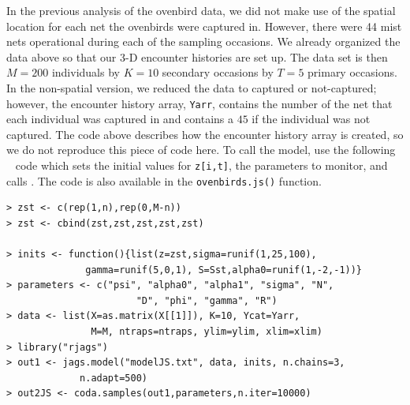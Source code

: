 In the previous analysis of the ovenbird data, we did not make use of
the spatial location for each net the ovenbirds were captured in.
However, there were 44 mist nets operational during each of the
sampling occasions.  We already organized the data above so that our
3-D encounter histories are set up.  The data set is then $M=200$
individuals by $K=10$ secondary occasions by $T=5$ primary occasions.
In the non-spatial version, we reduced the data to captured or
not-captured; however, the encounter history array, \mbox{\tt Yarr},
contains the number of the net that each individual was captured in
and contains a $45$ if the individual was not captured. The code above describes how the encounter
history array is created, so we
do not reproduce this piece of code here. To call the model, use the following
\R~ code which sets the initial values for \mbox{\tt z[i,t]}, the parameters to
monitor, and calls \jags.  The code is also available in the \verb+ovenbirds.js()+ function.

{\small 
\begin{verbatim}
> zst <- c(rep(1,n),rep(0,M-n))
> zst <- cbind(zst,zst,zst,zst,zst)

> inits <- function(){list(z=zst,sigma=runif(1,25,100),
              gamma=runif(5,0,1), S=Sst,alpha0=runif(1,-2,-1))}
> parameters <- c("psi", "alpha0", "alpha1", "sigma", "N",
                       "D", "phi", "gamma", "R")
> data <- list(X=as.matrix(X[[1]]), K=10, Ycat=Yarr,
               M=M, ntraps=ntraps, ylim=ylim, xlim=xlim)
> library("rjags")
> out1 <- jags.model("modelJS.txt", data, inits, n.chains=3,
             n.adapt=500)
> out2JS <- coda.samples(out1,parameters,n.iter=10000)
\end{verbatim}
}


